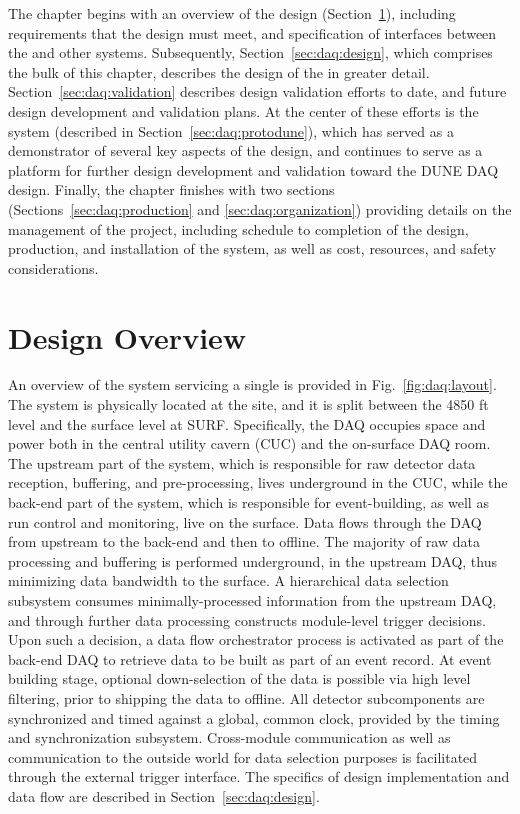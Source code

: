 The chapter begins with an overview of the  design
(Section~\ref{sec:daq:overview}), including requirements that the design must
meet, and specification of interfaces between the  and other
  systems. 
Subsequently, Section~\ref{sec:daq:design}, which comprises the bulk of this
chapter, describes the design of the   in greater detail.
Section~\ref{sec:daq:validation} describes design validation efforts to date,
and future design development and validation plans.
At the center of these efforts is the   system
(described in Section~\ref{sec:daq:protodune}), which has served as a
demonstrator of several key aspects of the   design, and
continues to serve as a platform for further design development and validation
toward the DUNE DAQ design. 
Finally, the chapter finishes with two sections
(Sections~\ref{sec:daq:production} and \ref{sec:daq:organization})
providing details on the management of the  project, including
schedule to completion of the design, production, and installation of the
system, as well as cost, resources, and safety considerations.

\section{Design Overview}
\label{sec:daq:overview}

An overview of the    system servicing a single
  is provided in Fig.~\ref{fig:daq:layout}.
The system is physically located at the  site, and it is split between
the 4850 ft level and the surface level at SURF.
Specifically, the DAQ occupies space and power both in the central utility
cavern (CUC) and the on-surface DAQ room.
The upstream part of the system, which is responsible for raw detector data
reception, buffering, and pre-processing, lives underground in the CUC, while
the back-end part of the system, which is responsible for event-building, as
well as run control and monitoring, live on the surface.
Data flows through the DAQ from upstream to the back-end and then to offline.
The majority of raw data processing and buffering is performed underground, in
the upstream DAQ, thus minimizing data bandwidth to the surface.
A hierarchical data selection subsystem consumes minimally-processed information
from the upstream DAQ, and through further data processing constructs
module-level trigger decisions.
Upon such a decision, a data flow orchestrator process is activated as part of
the back-end DAQ to retrieve data to be built as part of an event record.
At event building stage, optional down-selection of the data is possible via
high level filtering, prior to shipping the data to offline.
All detector subcomponents are synchronized and timed against a global, common
clock, provided by the timing and synchronization subsystem.
Cross-module communication as well as communication to the outside world for
data selection purposes is facilitated through the external trigger interface.
The specifics of design implementation and data flow are described in
Section~\ref{sec:daq:design}.

